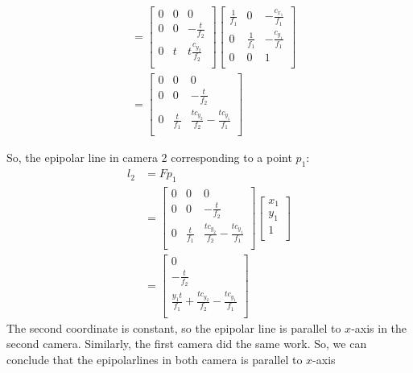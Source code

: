 \documentclass{article}
\begin{document}
\begin{align*}
&= \begin{bmatrix}
    0 & 0 & 0 \\
    0 & 0 & -\frac{t}{f_2} \\
    0 & t & t\frac{c_{y_2}}{f_2} \\
    \end{bmatrix}
\begin{bmatrix}
    \frac{1}{f_1} & 0 & -\frac{c_{x_1}}{f_1} \\
    0 & \frac{1}{f_1} & -\frac{c_{y_1}}{f_1} \\
    0 & 0 & 1 \\
    \end{bmatrix}\\
&= \begin{bmatrix}
    0 & 0 & 0 \\
    0 & 0 & -\frac{t}{f_2}\\
    0 & \frac{t}{f_1} & \frac{tc_{y_2}}{f_2}-\frac{tc_{y_1}}{f_1} \\
    \end{bmatrix}
\end{align*}

So,  the epipolar line in camera 2 corresponding to a point $p_1$:
\begin{align*}
    l_2 &= F p_1 \\
    &= \begin{bmatrix}
        0 & 0 & 0 \\
        0 & 0 & -\frac{t}{f_2}\\
        0 & \frac{t}{f_1} & \frac{tc_{y_2}}{f_2}-\frac{tc_{y_1}}{f_1} \\
        \end{bmatrix} \begin{bmatrix}
    x_1 \\
    y_1 \\
    1 \\
    \end{bmatrix}\\
    & =  \begin{bmatrix}
        0 \\
        -\frac{t}{f_2} \\
        \frac{y_1 t}{f_1}+\frac{tc_{y_2}}{f_2}-\frac{tc_{y_1}}{f_1}\\
        \end{bmatrix}
\end{align*}
The second coordinate is constant, so the epipolar line is parallel to $x$-axis in the second camera. Similarly, the first camera did the same work. So, we can conclude that the epipolarlines in both camera is parallel to $x$-axis
\end{document}
